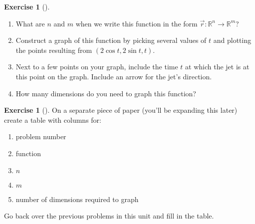 \documentclass[10pt,]{book}
\theoremstyle{plain}
\theoremstyle{definition}
\theoremstyle{definition}
\theoremstyle{definition}
\theoremstyle{definition}
\newtheorem{exploration}[project]{Exercise}
\theoremstyle{definition}
\numberwithin{equation}{section}
\begin{document}
\begin{exploration}[]\label{prob_jet_intro_for_space_curves}
\leavevmode%
\begin{enumerate}[font=\bfseries,label=(\alph*),ref=\alph*]
\item\label{task-174} What are \(n\) and \(m\) when we write this function in the form  \(\vec r\colon {\mathbb{R}}^n\to {\mathbb{R}}^m\)?%
\item\label{task-175} Construct a graph of this function by picking several values of \(t\) and plotting the points resulting from \((2\cos t, 2\sin t, t)\).%
\item\label{task-176} Next to a few points on your graph, include the time \(t\) at which the jet is at this point on the graph. Include an arrow for the jet's direction.%
\item\label{task-177} How many dimensions do you need to graph this function?%
\end{enumerate}
\end{exploration}
\begin{exploration}[]\label{prob_function_table}
On a separate piece of paper (you'll be expanding this later) create a table with columns for: \leavevmode%
\begin{itemize}[label=\textbullet]
\begin{enumerate}[font=\bfseries,label=(\alph*),ref=\alph*]
\item\label{task-178} problem number%
\item\label{task-179} function%
\item\label{task-180} \(n\)%
\item\label{task-181} \(m\)%
\item\label{task-182} number of dimensions required to graph%
\end{enumerate}
\end{itemize}
%
\par
Go back over the previous problems in this unit and fill in the table.%
\end{exploration}
\typeout{************************************************}
\typeout{************************************************}
\end{document}
